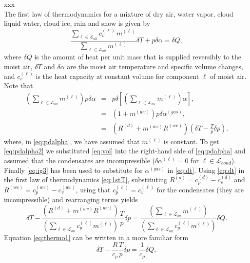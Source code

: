 \documentclass{agujournal}
\begin{document}
{xxx\\
The first law of thermodynamics for a mixture of dry air, water vapor, cloud liquid water, cloud ice, rain and snow is given by
\begin{equation}
\frac{\sum_{\ell\in \mathcal{L}_{all}} c_{v}^{(\ell)}\, m^{(\ell)}}{\sum_{\ell\in \mathcal{L}_{all}} m^{(\ell)}}\delta T+p\delta \alpha=\delta Q,\label{eq:1stT}
\end{equation}
where $\delta Q$ is the amount of heat per unit mass that is supplied reversibly to the moist air, $\delta T$ and $\delta \alpha$ are the moist air temperature and specific volume changes, and $c_v^{(\ell)}$ is the heat capacity at constant volume for component $\ell$ of moist air. Note that
\begin{eqnarray}
\left( \sum_{\ell \in \mathcal{L}_{all}} m^{(\ell)}\right)p\delta \alpha &=& p \delta \left[ \left( \sum_{\ell \in \mathcal{L}_{all}} m^{(\ell)} \right)\alpha  \right],\label{eq:pdalpha}\\
                                       &=& (1+m^{(wv)})p\delta \alpha^{(gas)},\label{eq:pdalpha2}\\
                                       &=& \left(R^{(d)}+m^{(wv)}R^{(wv)}\right)\left(\delta T-\frac{T}{p}\delta p\right)\label{eq:dt}.
\end{eqnarray}
where, in \eqref{eq:pdalpha}, we have assumed that $m^{(\ell)}$ is constant. To get \eqref{eq:pdalpha2} we substituted \eqref{eq:vol} into the right-hand side of \eqref{eq:pdalpha} and assumed that the condensates are incompressible ($\delta \alpha^{(\ell)}=0$ for $\ell \in \mathcal{L}_{cond}$). Finally \eqref{eq:ig3} has been used to substitute for $\alpha^{(gas)}$ in \eqref{eq:dt}.
Using \eqref{eq:dt} in the first law of thermodynamics \eqref{eq:1stT}, substituting $R^{(d)}=c_p^{(d)}-c_v^{(d)}$ and $R^{(wv)}=c_p^{(wv)}-c_{v}^{(wv)}$, using that $c_p^{(\ell)}=c^{(\ell)}_v$ for the condensates (they are incompressible) and rearranging terms yields
\begin{equation}
\delta T-\frac{\left(R^{(d)}+m^{(wv)}R^{(wv)}\right)}{\left(\sum_{\ell \in \mathcal{L}_{all}} c_p^{(\ell)}m^{(\ell)}\right)}\frac{T}{p}\delta p=\frac{\left(\sum_{\ell \in \mathcal{L}_{all}} m^{(\ell)}\right)}{\left(\sum_{\ell \in \mathcal{L}_{all}} c_p^{(\ell)}m^{(\ell)}\right)}\delta Q.\label{eq:thermo1}
\end{equation}
Equation \eqref{eq:thermo1} can be written in a more familiar form
\begin{equation}
\delta T-\frac{R}{c_p}\frac{T}{p}\delta p=\frac{1}{c_p}\delta Q\label{eq:thermo},

\end{equation}}
\end{document}
